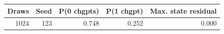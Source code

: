 \begin{tabular}{rrrrr}
\toprule
Draws & Seed & P(0 chgpts) & P(1 chgpt) & Max. state residual \\
\midrule
1024 & 123 & 0.748 & 0.252 & 0.000 \\
\bottomrule
\end{tabular}
